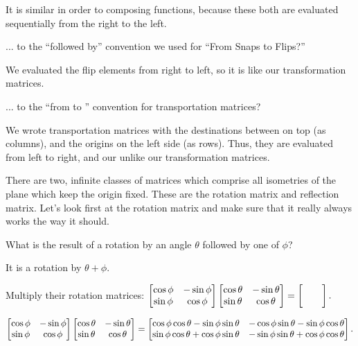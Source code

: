 \documentclass[../gatm_answers.tex]{subfiles}
\begin{document}
It is similar in order to composing functions, because these both are evaluated sequentially from the right to the left.

\begin{iinner_problem}
\item ... to the ``followed by'' convention we used for ``From Snaps to Flips?''
\end{iinner_problem}

We evaluated the flip elements from right to left, so it is like our transformation matrices.

\begin{iinner_problem}
\item ... to the ``from \underline{\phantom{0}} to \underline{\phantom{0}}'' convention for transportation matrices?
\end{iinner_problem}

We wrote transportation matrices with the destinations between on top (as columns), and the origins on the left side (as rows). Thus, they are evaluated from left to right, and our unlike our transformation matrices.

\begin{outer_problem}
\item There are two, infinite classes of matrices which comprise all isometries of the plane which keep the origin fixed. These are the rotation matrix and reflection matrix. Let's look first at the rotation matrix and make sure that it really always works the way it should.
\end{outer_problem}

\begin{inner_problem}[start=1]
\item What is the result of a rotation by an angle $\theta$ followed by one of $\phi$?
\end{inner_problem}

It is a rotation by $\theta + \phi$.

\begin{inner_problem}
\item Multiply their rotation matrices: $\twomat{\cos \phi}{-\sin \phi}{\sin\phi}{\cos\phi} \twomat{\cos \theta}{-\sin \theta}{\sin\theta}{\cos\theta}=\blanktwomat.$
\end{inner_problem}

$$\begin{bmatrix} \cos \phi & -\sin \phi \\ \sin\phi & \cos\phi \end{bmatrix} \begin{bmatrix} \cos \theta & -\sin \theta \\ \sin\theta & \cos\theta \end{bmatrix} = \begin{bmatrix} \cos\phi\cos\theta - \sin\phi\sin\theta & -\cos\phi\sin\theta-\sin\phi\cos\theta \\ \sin\phi\cos\theta + \cos\phi\sin\theta & -\sin\phi\sin\theta+\cos\phi\cos\theta \end{bmatrix}.$$
\end{document}
